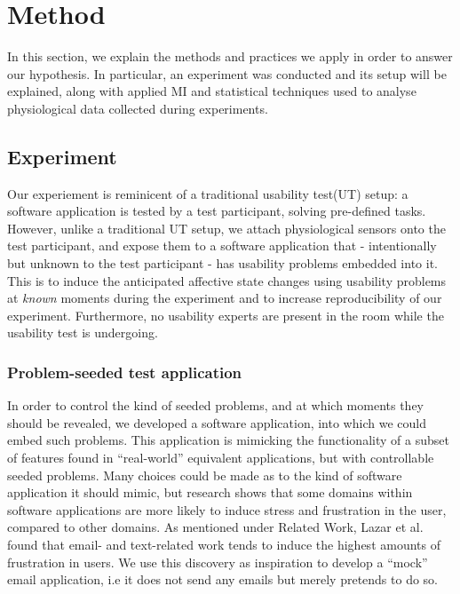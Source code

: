 \section{Method}
In this section, we explain the methods and practices we apply in order to answer our hypothesis. In particular, an
experiment was conducted and its setup will be explained, along with applied MI and statistical techniques used to analyse
physiological data collected during experiments.

\subsection{Experiment}
Our experiement is reminicent of a traditional usability test(UT) setup: a software application is tested by a test
participant, solving pre-defined tasks. However, unlike a traditional UT setup, we attach physiological sensors
onto the test participant, and expose them to a software application that - intentionally but unknown to the test
participant - has usability problems embedded into it. This is to induce the anticipated affective state changes using
usability problems at \textit{known} moments during the experiment and to increase reproducibility of our
experiment. Furthermore, no usability experts are present in the room while the usability test is undergoing.

\subsubsection{Problem-seeded test application}
In order to control the kind of seeded problems, and at which moments they should be revealed, we developed a software
application, into which we could embed such problems. This application is mimicking the functionality of a subset of
features found in ``real-world'' equivalent applications, but with controllable seeded problems.  Many choices could be
made as to the kind of software application it should mimic, but research shows that some domains within software
applications are more likely to induce stress and frustration in the user, compared to other domains.  As mentioned
under Related Work, Lazar et al.~\cite{frustration_with_computers} found that email- and text-related work tends to
induce the highest amounts of frustration in users. We use this discovery as inspiration to develop a ``mock'' email
application, i.e it does not send any emails but merely pretends to do so.

